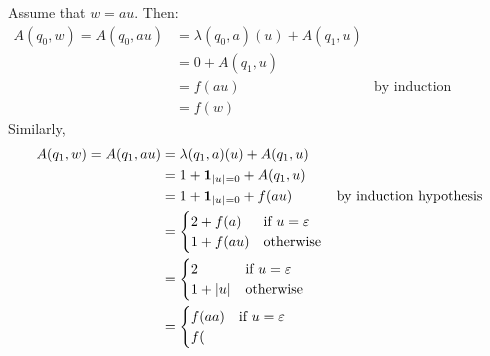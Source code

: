 \begin{proofof}
    Assume that $w = au$. Then:
    \begin{align*}
        A(q_0, w) = A(q_0, au) &= \lambda(q_0, a)(u) + A(q_1, u) \\ 
                               &= 0 + A(q_1,u) \\
                               &= f(au) & \text{by induction hypothesis} \\
                               &= f(w) 
    \end{align*}
    Similarly,
    \begin{align*}
        A(q_1, w) = A(q_1, au) &= \lambda(q_1, a)(u) + A(q_1, u) \\ 
                               &= 1 + \ind{\card{u} = 0} + A(q_1,u) \\
                               &= 1 + \ind{\card{u} = 0} + f(au) & \text{by induction hypothesis} \\
                               &= \begin{cases}
                                    2 + f(a) & \text{if $u = \varepsilon$} \\
                                    1 + f(au) & \text{otherwise}
                               \end{cases}
                               \\
                               &= \begin{cases}
                                    2 & \text{if $u = \varepsilon$} \\
                                    1 + \card{u} & \text{otherwise}
                               \end{cases}
                               \\
                               &= \begin{cases}
                                   f(aa) & \text{if $u = \varepsilon$} \\
                                   f(
                               \end{cases}
    \end{align*}
\end{proofof}


